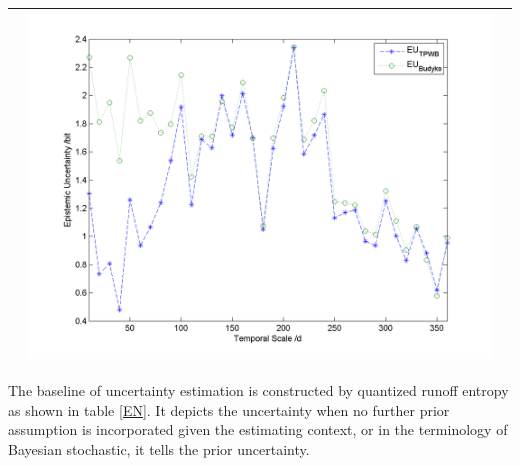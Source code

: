 \documentclass[11pt]{article}
\begin{document}
\begin{table}[H]
{\begin{tabular}{ccc}
&\begin{minipage}{.6\textwidth}\includegraphics[width=\linewidth]{resultgraph/11532500EU.png}\end{minipage}
\\
\bottomrule
\end{tabular}
}
\end{table} 

 
The baseline of uncertainty estimation is constructed by  quantized runoff entropy as shown in table \ref{EN}. It depicts the uncertainty when no further prior assumption is incorporated given the estimating context, or in the terminology of Bayesian stochastic, it tells the prior uncertainty.
\end{document}
